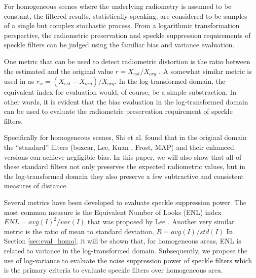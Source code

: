 \documentclass[journal]{IEEEtran}
\begin{document}
For homogeneous scenes where the underlying radiometry is assumed to be constant, 
	the filtered results, statistically speaking, are considered to be samples of 
		a single but complex stochastic process.
From a logarithmic transformation perspective, the radiometric preservation and speckle suppression requirements of speckle filters can be judged using the familiar bias and variance evaluation.

One metric that can be used to detect radiometric distortion is the ratio between the estimated and the original value $r = X_{est} / X_{org}$ \cite{Oliver_2004_SciTech} \cite{Medeiros_2003_IJRS}.
A somewhat similar metric is used in \cite{Wang_2005_MIPR} as $r_w = (X_{est} - X_{org} )/ X_{org}$.
In the log-transformed domain, the equivalent index for evaluation would, of course, be a simple substraction.
In other words, it is evident that the bias evaluation in the log-transformed domain can be used to evaluate the radiometric preservation requirement of speckle filters. 

Specifically for homogeneous scenes, Shi et al. \cite{Shi_IGARSS_1994} found that 
	in the original domain the ``standard'' filters (boxcar, Lee\cite{Lee_PAMI_1980}, Kuan \cite{Kuan_1985_PAMI}, Frost\cite{Frost_PAMI_1982}, MAP\cite{Lopes_IGARSS_1990}) and their enhanced versions \cite{Lopes_TGRS_1990} can achieve negligible bias. 
In this paper, we will also show that all of these standard filters 
	not only preserves the expected radiometric values, 
	but in the log-transformed domain they also preserve a few subtractive and consistent measures of distance.

Several metrics have been developed to evaluate speckle suppression power.
The most common measure is the Equivalent Number of Looks (ENL) index 
$ENL=avg(I)^2/var(I)$
that was proposed by Lee \cite{Lee_1981_CGIP}.
Another very similar metric is the ratio of mean to standard deviation, $R=avg(I)/std(I)$ \cite{Gagnon_SPIEProc_1997} 
In Section \ref{sec:eval_homo}, it will be shown that, for homogeneous areas, ENL is related to variance in the log-transformed domain.
Subsequently, we propose the use of log-variance to evaluate the noise suppression power of speckle filters which is the primary criteria to evaluate speckle filters over homogeneous area.
\end{document}
